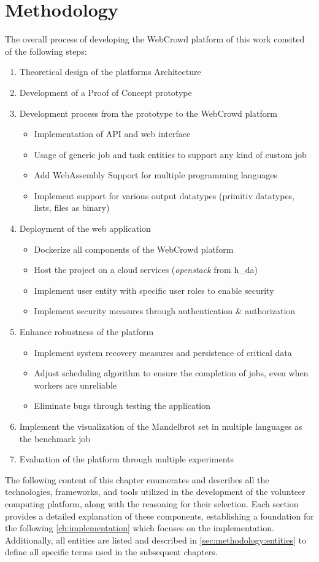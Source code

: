 \chapter{Methodology}
\label{ch:methodology}
The overall process of developing the WebCrowd platform of this work consited of the following steps:
\begin{enumerate}
  \item Theoretical design of the platforms Architecture
  \item Development of a Proof of Concept prototype
  \item Development process from the prototype to the WebCrowd platform
  \begin{itemize}
    \item Implementation of \acs{API} and web interface
    \item Usage of generic job and task entities to support any kind of custom job
    \item Add WebAssembly Support for multiple programming languages
    \item Implement support for various output datatypes (primitiv datatypes, lists, files as binary)
  \end{itemize}
  \item Deployment of the web application
  \begin{itemize}
    \item Dockerize all components of the WebCrowd platform
    \item Host the project on a cloud services (\emph{openstack} from h\_da)
    \item Implement user entity with specific user roles to enable security
    \item Implement security measures through authentication \& authorization
  \end{itemize}
  \item Enhance robustness of the platform
  \begin{itemize}
    \item Implement system recovery measures and persistence of critical data
    \item Adjust scheduling algorithm to ensure the completion of jobs, even when workers are unreliable
    \item Eliminate bugs through testing the application
  \end{itemize}
  \item Implement the visualization of the Mandelbrot set in multiple languages as the benchmark job
  \item Evaluation of the platform through multiple experiments 
\end{enumerate}
The following content of this chapter enumerates and describes all the technologies, frameworks, and tools utilized in the development of the volunteer computing platform, along with the reasoning for their selection. Each section provides a detailed explanation of these components, establishing a foundation for the following \autoref{ch:implementation} which focuses on the implementation. Additionally, all entities are listed and described in \autoref{sec:methodology:entities} to define all specific terms used in the subsequent chapters.

